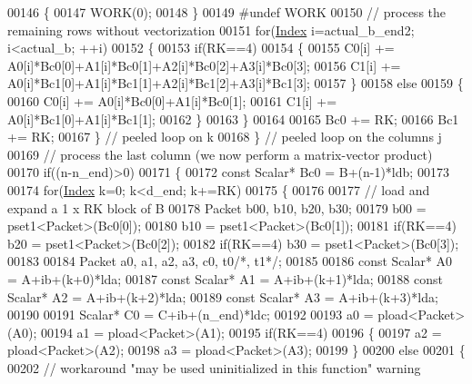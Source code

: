 \begin{DoxyCode}
00146         \{
00147           WORK(0);
00148         \}
00149 \textcolor{preprocessor}{#undef WORK}
00150         \textcolor{comment}{// process the remaining rows without vectorization}
00151         \textcolor{keywordflow}{for}(\hyperlink{namespace_eigen_a62e77e0933482dafde8fe197d9a2cfde}{Index} i=actual\_b\_end2; i<actual\_b; ++i)
00152         \{
00153           \textcolor{keywordflow}{if}(RK==4)
00154           \{
00155             C0[i] += A0[i]*Bc0[0]+A1[i]*Bc0[1]+A2[i]*Bc0[2]+A3[i]*Bc0[3];
00156             C1[i] += A0[i]*Bc1[0]+A1[i]*Bc1[1]+A2[i]*Bc1[2]+A3[i]*Bc1[3];
00157           \}
00158           \textcolor{keywordflow}{else}
00159           \{
00160             C0[i] += A0[i]*Bc0[0]+A1[i]*Bc0[1];
00161             C1[i] += A0[i]*Bc1[0]+A1[i]*Bc1[1];
00162           \}
00163         \}
00164         
00165         Bc0 += RK;
00166         Bc1 += RK;
00167       \} \textcolor{comment}{// peeled loop on k}
00168     \} \textcolor{comment}{// peeled loop on the columns j}
00169     \textcolor{comment}{// process the last column (we now perform a matrix-vector product)}
00170     \textcolor{keywordflow}{if}((n-n\_end)>0)
00171     \{
00172       \textcolor{keyword}{const} Scalar* Bc0 = B+(n-1)*ldb;
00173       
00174       \textcolor{keywordflow}{for}(\hyperlink{namespace_eigen_a62e77e0933482dafde8fe197d9a2cfde}{Index} k=0; k<d\_end; k+=RK)
00175       \{
00176         
00177         \textcolor{comment}{// load and expand a 1 x RK block of B}
00178         Packet b00, b10, b20, b30;
00179                   b00 = pset1<Packet>(Bc0[0]);
00180                   b10 = pset1<Packet>(Bc0[1]);
00181         \textcolor{keywordflow}{if}(RK==4) b20 = pset1<Packet>(Bc0[2]);
00182         \textcolor{keywordflow}{if}(RK==4) b30 = pset1<Packet>(Bc0[3]);
00183         
00184         Packet a0, a1, a2, a3, c0, t0\textcolor{comment}{/*, t1*/};
00185         
00186         \textcolor{keyword}{const} Scalar* A0 = A+ib+(k+0)*lda;
00187         \textcolor{keyword}{const} Scalar* A1 = A+ib+(k+1)*lda;
00188         \textcolor{keyword}{const} Scalar* A2 = A+ib+(k+2)*lda;
00189         \textcolor{keyword}{const} Scalar* A3 = A+ib+(k+3)*lda;
00190         
00191         Scalar* C0 = C+ib+(n\_end)*ldc;
00192         
00193                   a0 = pload<Packet>(A0);
00194                   a1 = pload<Packet>(A1);
00195         \textcolor{keywordflow}{if}(RK==4)
00196         \{
00197           a2 = pload<Packet>(A2);
00198           a3 = pload<Packet>(A3);
00199         \}
00200         \textcolor{keywordflow}{else}
00201         \{
00202           \textcolor{comment}{// workaround "may be used uninitialized in this function" warning}

\end{DoxyCode}
